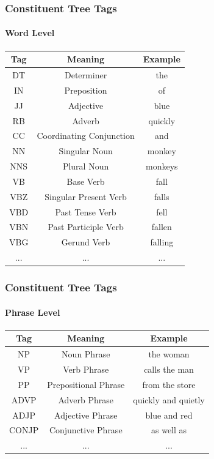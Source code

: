 \documentclass[mathserif]{beamer}
\begin{document}
\begin{frame}

\frametitle{Constituent Tree Tags}
\framesubtitle{Word Level}

\centering

\begin{tabular}{c | c | c}
Tag & Meaning & Example \\
\hline
DT & Determiner & the \\
IN & Preposition & of\\
JJ & Adjective & blue\\
RB & Adverb & quickly\\
CC & Coordinating Conjunction & and \\
NN & Singular Noun & monkey\\
NNS & Plural Noun & monkeys\\
VB & Base Verb & fall\\
VBZ & Singular Present Verb & falls\\
VBD & Past Tense Verb & fell\\
VBN & Past Participle Verb & fallen\\
VBG & Gerund Verb & falling\\
... & ... & ...\\
\end{tabular}

\end{frame}

\begin{frame}

\frametitle{Constituent Tree Tags}
\framesubtitle{Phrase Level}

\centering

\begin{tabular}{c | c | c}
Tag & Meaning & Example \\
\hline
NP & Noun Phrase & the woman \\
VP & Verb Phrase & calls the man \\
PP & Prepositional Phrase & from the store \\
ADVP & Adverb Phrase & quickly and quietly \\
ADJP & Adjective Phrase & blue and red \\
CONJP & Conjunctive Phrase & as well as \\
... & ... & ...\\
\end{tabular}

\end{frame}
\end{document}
